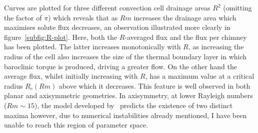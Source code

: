 \documentclass[11pt]{proc}
\begin{document}
Curves are plotted for three different convection cell drainage areas $R^2$ (omitting the factor of $\pi$) which reveals that as $Rm$ increases the drainage area which maximises solute flux decreases, an observation illustrated more clearly in figure~\ref{subfig:R-plot}. Here, both the $R$-averaged flux and the flux per chimney has been plotted. The latter increases monotonically with $R$, as increasing the radius of the cell also increases the size of the thermal boundary layer in which baroclinic torque is produced, driving a greater flow. On the other hand the average flux, whilst initially increasing with $R$, has a maximum value at a critical radius $R_c(Rm)$ above which it decreases. This feature is well observed in both planar and axisymmetric geometries. In axisymmetry, at lower Rayleigh numbers ($Rm \sim 15$), the model developed by~\citet*{rees-jones-worster-13} predicts the existence of two distinct maxima however, due to numerical instabilities already mentioned, I have been unable to reach this region of parameter space. 

\end{document}
